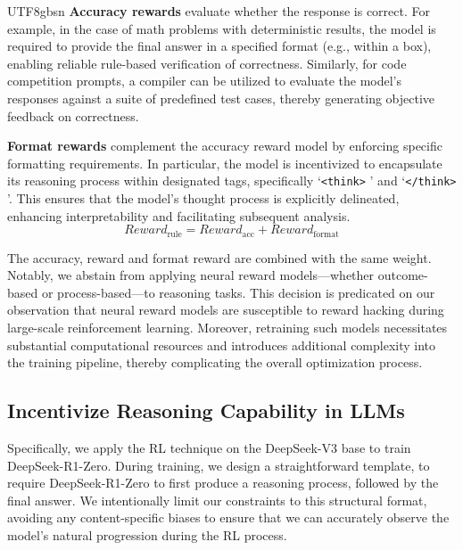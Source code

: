 \documentclass[11pt, a4paper, logo, copyright, nonumbering]{deepseek}
\begin{document}
\begin{CJK*}{UTF8}{gbsn}
\textbf{Accuracy rewards} evaluate whether the response is correct. For example, in the case of math problems with deterministic results, the model is required to provide the final answer in a specified format (e.g., within a box), enabling reliable rule-based verification of correctness. Similarly, for code competition prompts, a compiler can be utilized to evaluate the model's responses against a suite of predefined test cases, thereby generating objective feedback on correctness.

\textbf{Format rewards} complement the accuracy reward model by enforcing specific formatting requirements. In particular, the model is incentivized to encapsulate its reasoning process within designated tags, specifically `\texttt{<think>} ' and `\texttt{</think>} '. This ensures that the model's thought process is explicitly delineated, enhancing interpretability and facilitating subsequent analysis. 
\begin{equation}
    Reward_\text{rule} = Reward_\text{acc} + Reward_\text{format}
\end{equation}

The accuracy, reward and format reward are combined with the same weight. 
Notably, we abstain from applying neural reward models—whether outcome-based or process-based—to reasoning tasks. This decision is predicated on our observation that neural reward models are susceptible to reward hacking during large-scale reinforcement learning. Moreover, retraining such models necessitates substantial computational resources and introduces additional complexity into the training pipeline, thereby complicating the overall optimization process.



\subsection{Incentivize Reasoning Capability in LLMs}
Specifically, we apply the RL technique on the DeepSeek-V3 base to train DeepSeek-R1-Zero. During training, we design a straightforward template, to require DeepSeek-R1-Zero to first produce a reasoning process, followed by the final answer. We intentionally limit our constraints to this structural format, avoiding any content-specific biases to ensure that we can accurately observe the model's natural progression during the RL process.




\end{CJK*}
\end{document}
